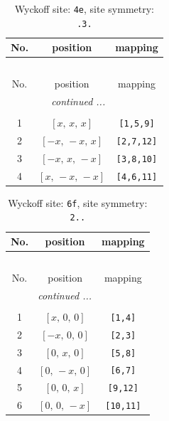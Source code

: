 \documentclass[fleqn,8pt]{jsarticle}
\begin{document}
\begin{longtable}{ccc}
\caption{Wyckoff site: {\tt 4e}, site symmetry: {\tt .3.}}
 \\
 \hline \hline
No. & position & mapping \\ \hline \endfirsthead

\multicolumn{2}{l}{\tablename\ \thetable{}} \\
 \hline \hline
No. & position & mapping \\ \hline \endhead

 \hline \hline
\multicolumn{2}{r}{\footnotesize\it continued ...} \\ \endfoot

 \hline \hline
\multicolumn{2}{r}{} \\ \endlastfoot

1 & $\left[ x,\, x,\, x \right]$ & {\tt [1,5,9]} \\ \hline
2 & $\left[ - x,\, - x,\, x \right]$ & {\tt [2,7,12]} \\ \hline
3 & $\left[ - x,\, x,\, - x \right]$ & {\tt [3,8,10]} \\ \hline
4 & $\left[ x,\, - x,\, - x \right]$ & {\tt [4,6,11]} \\
\end{longtable}
\renewcommand{\arraystretch}{1.2}
\begin{longtable}{ccc}
\caption{Wyckoff site: {\tt 6f}, site symmetry: {\tt 2..}}
 \\
 \hline \hline
No. & position & mapping \\ \hline \endfirsthead

\multicolumn{2}{l}{\tablename\ \thetable{}} \\
 \hline \hline
No. & position & mapping \\ \hline \endhead

 \hline \hline
\multicolumn{2}{r}{\footnotesize\it continued ...} \\ \endfoot

 \hline \hline
\multicolumn{2}{r}{} \\ \endlastfoot

1 & $\left[ x,\, 0,\, 0 \right]$ & {\tt [1,4]} \\ \hline
2 & $\left[ - x,\, 0,\, 0 \right]$ & {\tt [2,3]} \\ \hline
3 & $\left[ 0,\, x,\, 0 \right]$ & {\tt [5,8]} \\ \hline
4 & $\left[ 0,\, - x,\, 0 \right]$ & {\tt [6,7]} \\ \hline
5 & $\left[ 0,\, 0,\, x \right]$ & {\tt [9,12]} \\ \hline
6 & $\left[ 0,\, 0,\, - x \right]$ & {\tt [10,11]} \\
\end{longtable}
\end{document}
